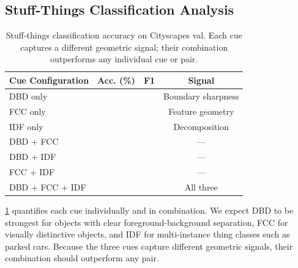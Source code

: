 \documentclass[10pt,twocolumn,letterpaper]{article}
\begin{document}
\subsection{Stuff-Things Classification Analysis}

\begin{table}[t]
\centering
\caption{Stuff-things classification accuracy on Cityscapes val. Each cue captures a different geometric signal; their combination outperforms any individual cue or pair.}
\label{tab:stc_analysis}
\setlength{\tabcolsep}{4pt}
\begin{tabular}{lccc}
\toprule
Cue Configuration & Acc. (\%) & F1 & Signal \\
\midrule
DBD only & \underline{\hspace{1.5em}} & \underline{\hspace{1.5em}} & Boundary sharpness \\
FCC only & \underline{\hspace{1.5em}} & \underline{\hspace{1.5em}} & Feature geometry \\
IDF only & \underline{\hspace{1.5em}} & \underline{\hspace{1.5em}} & Decomposition \\
\midrule
DBD + FCC & \underline{\hspace{1.5em}} & \underline{\hspace{1.5em}} & --- \\
DBD + IDF & \underline{\hspace{1.5em}} & \underline{\hspace{1.5em}} & --- \\
FCC + IDF & \underline{\hspace{1.5em}} & \underline{\hspace{1.5em}} & --- \\
\midrule
DBD + FCC + IDF & \underline{\hspace{1.5em}} & \underline{\hspace{1.5em}} & All three \\
\bottomrule
\end{tabular}
\end{table}

\cref{tab:stc_analysis} quantifies each cue individually and in combination. We expect DBD to be strongest for objects with clear foreground-background separation, FCC for visually distinctive objects, and IDF for multi-instance thing classes such as parked cars. Because the three cues capture different geometric signals, their combination should outperform any pair.
\end{document}
